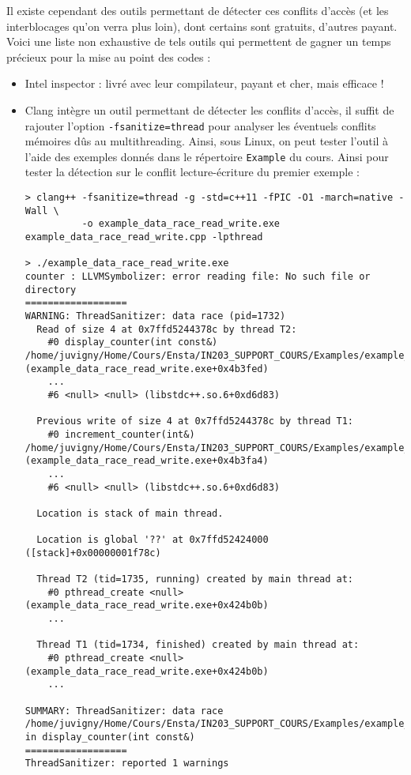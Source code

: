 \documentclass[fleqn,11pt]{article}
\begin{document}
Il existe cependant des outils permettant de détecter ces conflits d'accès (et les interblocages qu'on verra plus loin), dont certains sont gratuits, d'autres payant. Voici une liste non exhaustive de tels outils
qui permettent de gagner un temps précieux pour la mise au point des codes :
\begin{itemize}
  \item Intel inspector : livré avec leur compilateur, payant et cher, mais efficace !
  \item Clang intègre un outil permettant de détecter les conflits d'accès, il suffit de rajouter l'option
  \texttt{-fsanitize=thread} pour analyser les éventuels conflits mémoires dûs au multithreading. Ainsi, sous Linux, on peut tester l'outil à l'aide des exemples donnés dans le répertoire \texttt{Example} du cours.
  Ainsi pour tester la détection sur le conflit lecture-écriture du premier exemple :
  \begin{verbatim}
> clang++ -fsanitize=thread -g -std=c++11 -fPIC -O1 -march=native -Wall \
          -o example_data_race_read_write.exe example_data_race_read_write.cpp -lpthread

> ./example_data_race_read_write.exe
counter : LLVMSymbolizer: error reading file: No such file or directory
==================
WARNING: ThreadSanitizer: data race (pid=1732)
  Read of size 4 at 0x7ffd5244378c by thread T2:
    #0 display_counter(int const&) /home/juvigny/Home/Cours/Ensta/IN203_SUPPORT_COURS/Examples/example_data_race_read_write.cpp:16:38 (example_data_race_read_write.exe+0x4b3fed)
    ...
    #6 <null> <null> (libstdc++.so.6+0xd6d83)

  Previous write of size 4 at 0x7ffd5244378c by thread T1:
    #0 increment_counter(int&) /home/juvigny/Home/Cours/Ensta/IN203_SUPPORT_COURS/Examples/example_data_race_read_write.cpp:9:19 (example_data_race_read_write.exe+0x4b3fa4)
    ...
    #6 <null> <null> (libstdc++.so.6+0xd6d83)

  Location is stack of main thread.

  Location is global '??' at 0x7ffd52424000 ([stack]+0x00000001f78c)

  Thread T2 (tid=1735, running) created by main thread at:
    #0 pthread_create <null> (example_data_race_read_write.exe+0x424b0b)
    ...

  Thread T1 (tid=1734, finished) created by main thread at:
    #0 pthread_create <null> (example_data_race_read_write.exe+0x424b0b)
    ...

SUMMARY: ThreadSanitizer: data race /home/juvigny/Home/Cours/Ensta/IN203_SUPPORT_COURS/Examples/example_data_race_read_write.cpp:16:38 in display_counter(int const&)
==================
ThreadSanitizer: reported 1 warnings
  \end{verbatim}


\end{itemize}
\end{document}

